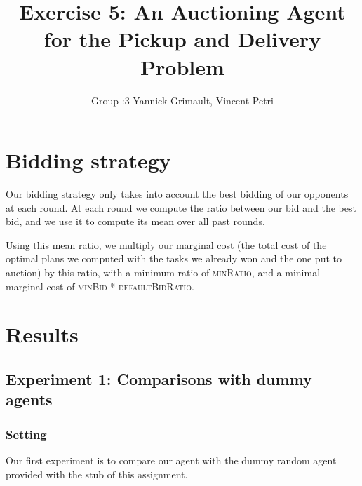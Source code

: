 \documentclass[11pt]{article}
\title{\bf Exercise 5: An Auctioning Agent for the Pickup and Delivery Problem}
\author{Group \textnumero:3 Yannick Grimault, Vincent Petri}
\begin{document}
\maketitle

\section{Bidding strategy}
Our bidding strategy only takes into account the best bidding of our opponents at each round. At each round we compute the ratio between our bid and the best bid, and we use it to compute its mean over all past rounds.

Using this mean ratio, we multiply our marginal cost (the total cost of the optimal plans we computed with the tasks we already won and the one put to auction) by this ratio, with a minimum ratio of \textsc{minRatio}, and a minimal marginal cost of \textsc{minBid} * \textsc{defaultBidRatio}.

\section{Results}

\subsection{Experiment 1: Comparisons with dummy agents}

\subsubsection{Setting}
Our first experiment is to compare our agent with the dummy random agent provided with the stub of this assignment.
\end{document}
